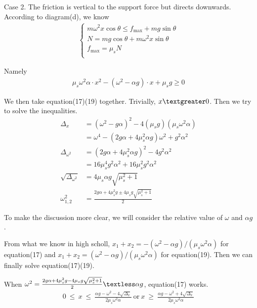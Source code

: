 \documentclass[12pt,a4paper]{article}
\begin{document}
\par Case 2. The friction is vertical to the support force but directs downwards. According to diagram(d), we know
\begin{align}
	\left\{ \begin{array}{l}
		m\omega^2 x\cos\theta \leq f_{\max}+mg\sin\theta\\
		N=mg\cos\theta+m\omega^2 x\sin\theta\\
		f_{\max}=\mu_s N\\			
	\end{array} \right.	
\end{align}
\par Namely
\begin{align}
	\mu_s\omega^2\alpha\cdot x^2 - (\omega^2-\alpha g)\cdot x +\mu_s g \geq 0
\end{align}
\par We then take equation(17)(19) together. Trivially, $x \textgreater 0$. Then we try to solve the inequalities.
\begin{align*}
	\Delta_x &= (\omega^2-g\alpha)^2 - 4(\mu_s g)(\mu_s\omega^2\alpha)\\
	&= \omega^4 - (2g\alpha + 4\mu_s^2\alpha g)\omega^2 + g^2\alpha^2\\
	\Delta_{\omega^2} &= (2g\alpha + 4\mu_s^2\alpha g)^2 - 4g^2\alpha^2\\
	&= 16\mu_s^4g^2\alpha^2 + 16\mu_s^2g^2\alpha^2\\
	\sqrt{\Delta_{\omega^2}} &= 4\mu_s\alpha g \sqrt{\mu_s^2 + 1}\\
	\omega_{1,2}^2 &= \frac{2g\alpha + 4\mu_s^2 g \pm 4\mu_s g\sqrt{\mu_s^2 + 1}}{2}
\end{align*}
\par To make the discussion more clear, we will consider the relative value of $\omega$ and $\alpha g$.
\par From what we know in high scholl, $x_1 + x_2 = -(\omega^2 - \alpha g)/(\mu_s \omega^2\alpha)$ for equation(17) and $x_1 + x_2 = (\omega^2 - \alpha g)/(\mu_s \omega^2\alpha)$ for equation(19). Then we can finally solve equation(17)(19).
\par When $\omega^2 = \frac{2g\alpha + 4\mu_s^2 g - 4\mu_s g\sqrt{\mu_s^2 + 1}}{2} \textless \alpha g$, equation(17) works.
\begin{align*}
	0\ \leq\ x\ \leq\ \frac{\alpha g - \omega^2 - 4\sqrt{\Delta_x}}{2\mu_s\omega^2\alpha}\ \text{or}\ x\ \geq\ \frac{\alpha g - \omega^2 + 4\sqrt{\Delta_x}}{2\mu_s\omega^2\alpha}
\end{align*}
\end{document}
